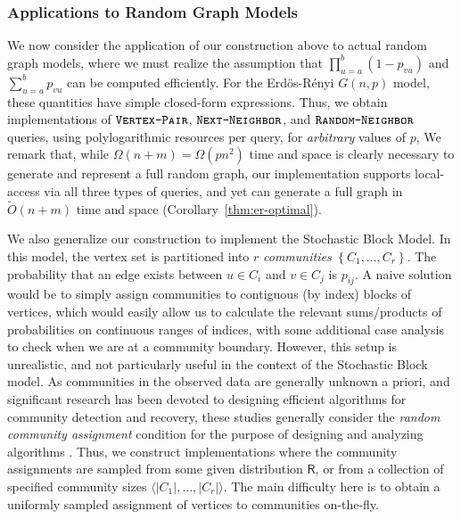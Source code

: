\subsubsection{Applications to Random Graph Models}
\label{sec:applications_to_random_graph_models}
We now consider the application of our construction above to actual random graph models,
where we must realize the assumption that $\prod^{b}_{u=a} (1-p_{vu})$ and $\sum^{b}_{u=a} p_{vu}$ can be computed efficiently.
For the Erd\"{o}s-R\'{e}nyi $G(n,p)$ model, these quantities have simple closed-form expressions.
Thus, we obtain implementations of $\texttt{\textsc{Vertex-Pair}}$, $\texttt{\textsc{Next-Neighbor}}$, and $\texttt{\textsc{Random-Neighbor}}$ queries,
using polylogarithmic resources per query, for \emph{arbitrary} values of $p$,
We remark that, while $\Omega(n+m) = \Omega(p n^2)$ time and space is clearly necessary to generate and represent a full random graph,
our implementation supports local-access via all three types of queries, and yet can generate a full graph in $\widetilde{O}(n+m)$ time and space
(Corollary~\ref{thm:er-optimal}).

We also generalize our construction to implement the Stochastic Block Model.
In this model, the vertex set is partitioned into $r$ \emph{communities} $\left\{ C_1, \ldots, C_r \right\}$.
The probability that an edge exists between $u\in C_i$ and $v \in C_j$ is $p_{ij}$.
A naive solution would be to simply assign communities to contiguous (by index) blocks of vertices,
which would easily allow us to calculate the relevant sums/products of probabilities on continuous ranges of indices,
with some additional case analysis to check when we are at a community boundary.
However, this setup is unrealistic, and not particularly useful in the context of the Stochastic Block model.
As communities in the observed data are generally unknown a priori,
and significant research has been devoted to designing efficient algorithms for community detection and recovery, these studies generally consider
the \emph{random community assignment} condition for the purpose of designing and analyzing algorithms \cite{mossel2015reconstruction}.
Thus, we construct implementations where the community assignments are sampled from some given distribution $\mathsf R$,
or from a collection of specified community sizes $\langle |C_1|, \ldots, |C_r|\rangle$.
The main difficulty here is to obtain a uniformly sampled assignment of vertices to communities on-the-fly.

